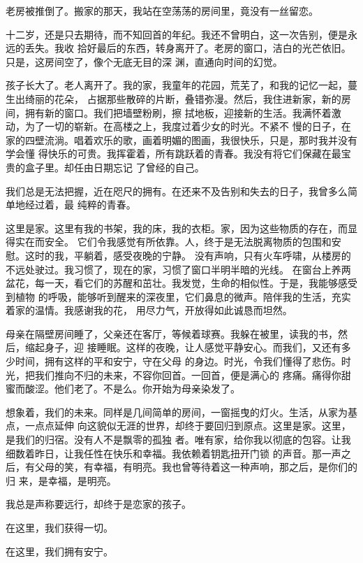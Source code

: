 		老房被推倒了。搬家的那天，我站在空荡荡的房间里，竟没有一丝留恋。

		十二岁，还是只去期待，而不知回首的年纪。我还不曾明白，这一次告别，便是永远的丢失。我收
	拾好最后的东西，转身离开了。老房的窗口，洁白的光芒依旧。只是，这房间空了，像个无底无目的深
	渊，直通向时间的幻觉。

		孩子长大了。老人离开了。我的家，我童年的花园，荒芜了，和我的记忆一起，蔓生出绮丽的花朵，
	占据那些散碎的片断，叠错弥漫。然后，我住进新家，新的房间，拥有新的窗口。我们把墙壁粉刷，擦
	拭地板，迎接新的生活。我满怀着激动，为了一切的崭新。在高楼之上，我度过着少女的时光。不紧不
	慢的日子，在家的四壁流淌。唱着欢乐的歌，画着明媚的图画，我很快乐，只是，那时我并没有学会懂
	得快乐的可贵。我挥霍着，所有跳跃着的青春。我没有将它们保藏在最宝贵的盒子里。却任由日期忘记
	了曾经的自己。

		我们总是无法把握，近在咫尺的拥有。在还来不及告别和失去的日子，我曾多么简单地经过着，最
	纯粹的青春。

		这里是家。这里有我的书架，我的床，我的衣柜。家，因为这些物质的存在，而显得实在而安全。
	它们令我感觉有所依靠。人，终于是无法脱离物质的包围和安慰。这时的我，平躺着，感受夜晚的宁静。
	没有声响，只有火车呼啸，从楼房的不远处驶过。我习惯了，现在的家，习惯了窗口半明半暗的光线。
	在窗台上养两盆花，每一天，看它们的苏醒和茁壮。我发觉，生命的相似性。于是，我能够感受到植物
	的呼吸，能够听到醒来的深夜里，它们鼻息的微声。陪伴我的生活，充实着家的温情。我感谢我的花，
	用尽力气，开放得如此诚恳而坦然。

		母亲在隔壁房间睡了，父亲还在客厅，等候着球赛。我躲在被里，读我的书，然后，缩起身子，迎
	接睡眠。这样的夜晚，让人感觉平静安心。而我们，又还有多少时间，拥有这样的平和安宁，守在父母
	的身边。时光，令我们懂得了悲伤。时光，把我们推向不归的未来，不容你回首。一回首，便是满心的
	疼痛。痛得你甜蜜而酸涩。他们老了。不是么。你开始为母亲染发了。

		想象着，我们的未来。同样是几间简单的房间，一窗摇曳的灯火。生活，从家为基点，一点点延伸
	向这貌似无涯的世界，却终于要回归到原点。这里是家。这里，是我们的归宿。没有人不是飘零的孤独
	者。唯有家，给你我以彻底的包容。让我细数着昨日，让我任性在快乐和幸福。我依赖着钥匙扭开门锁
	的声音。那一声之后，有父母的笑，有幸福，有明亮。我也曾等待着这一种声响，那之后，是你们的归
	来，是幸福，是明亮。

		我总是声称要远行，却终于是恋家的孩子。

		在这里，我们获得一切。

		在这里，我们拥有安宁。

	\endwriting


